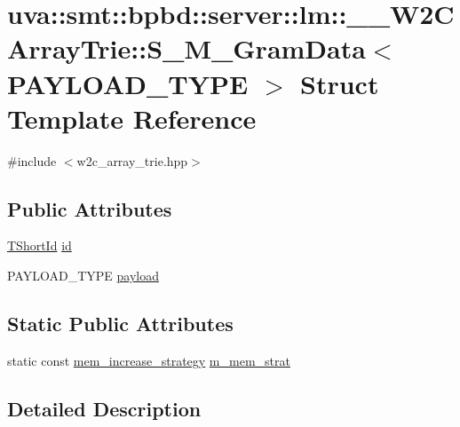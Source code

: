 \hypertarget{structuva_1_1smt_1_1bpbd_1_1server_1_1lm_1_1_____w2_c_array_trie_1_1_s___m___gram_data}{}\section{uva\+:\+:smt\+:\+:bpbd\+:\+:server\+:\+:lm\+:\+:\+\_\+\+\_\+\+W2\+C\+Array\+Trie\+:\+:S\+\_\+\+M\+\_\+\+Gram\+Data$<$ P\+A\+Y\+L\+O\+A\+D\+\_\+\+T\+Y\+P\+E $>$ Struct Template Reference}
\label{structuva_1_1smt_1_1bpbd_1_1server_1_1lm_1_1_____w2_c_array_trie_1_1_s___m___gram_data}


{\ttfamily \#include $<$w2c\+\_\+array\+\_\+trie.\+hpp$>$}

\subsection*{Public Attributes}
\begin{DoxyCompactItemize}
\item 
\hyperlink{namespaceuva_1_1smt_1_1bpbd_1_1server_1_1lm_1_1identifiers_a33043a191e9a637dea742a89d23c8bdc}{T\+Short\+Id} \hyperlink{structuva_1_1smt_1_1bpbd_1_1server_1_1lm_1_1_____w2_c_array_trie_1_1_s___m___gram_data_a0b235c9677bb7fe150c1c0b9d400f2bc}{id}
\item 
P\+A\+Y\+L\+O\+A\+D\+\_\+\+T\+Y\+P\+E \hyperlink{structuva_1_1smt_1_1bpbd_1_1server_1_1lm_1_1_____w2_c_array_trie_1_1_s___m___gram_data_a623cb2bdb3aea0d0d9a88110271fe89b}{payload}
\end{DoxyCompactItemize}
\subsection*{Static Public Attributes}
\begin{DoxyCompactItemize}
\item 
static const \hyperlink{classuva_1_1utils_1_1containers_1_1mem__increase__strategy}{mem\+\_\+increase\+\_\+strategy} \hyperlink{structuva_1_1smt_1_1bpbd_1_1server_1_1lm_1_1_____w2_c_array_trie_1_1_s___m___gram_data_ac63b204aef5900bbd9caf0aed3c62e23}{m\+\_\+mem\+\_\+strat}
\end{DoxyCompactItemize}


\subsection{Detailed Description}
